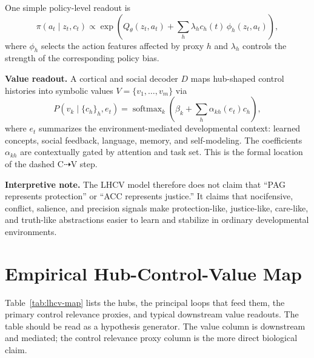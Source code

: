 \documentclass[11pt]{article}
\begin{document}
One simple policy-level readout is
\begin{equation}
  \pi(a_t \mid z_t, c_t)
  \propto
  \exp\left(Q_\theta(z_t,a_t) + \sum_h \lambda_h c_h(t)\,\phi_h(z_t,a_t)\right),
\end{equation}
where $\phi_h$ selects the action features affected by proxy $h$ and $\lambda_h$ controls the strength of the corresponding policy bias.

\textbf{Value readout.} A cortical and social decoder $D$ maps hub-shaped control histories into symbolic values $V = \{v_1, \ldots, v_m\}$ via
\begin{equation}
  P\left(v_k \mid \{c_h\}_h, e_t\right)
  = \operatorname{softmax}_k\left(\beta_k + \sum_h \alpha_{kh}(e_t)c_h\right),
\end{equation}
where $e_t$ summarizes the environment-mediated developmental context: learned concepts, social feedback, language, memory, and self-modeling. The coefficients $\alpha_{kh}$ are contextually gated by attention and task set. This is the formal location of the dashed $\mathrm{C}\dashrightarrow\mathrm{V}$ step.

\textbf{Interpretive note.} The LHCV model therefore does not claim that ``PAG represents protection'' or ``ACC represents justice.'' It claims that nocifensive, conflict, salience, and precision signals make protection-like, justice-like, care-like, and truth-like abstractions easier to learn and stabilize in ordinary developmental environments.

\section{Empirical Hub-Control-Value Map}

Table~\ref{tab:lhcv-map} lists the hubs, the principal loops that feed them, the primary control relevance proxies, and typical downstream value readouts. The table should be read as a hypothesis generator. The value column is downstream and mediated; the control relevance proxy column is the more direct biological claim.
\end{document}
